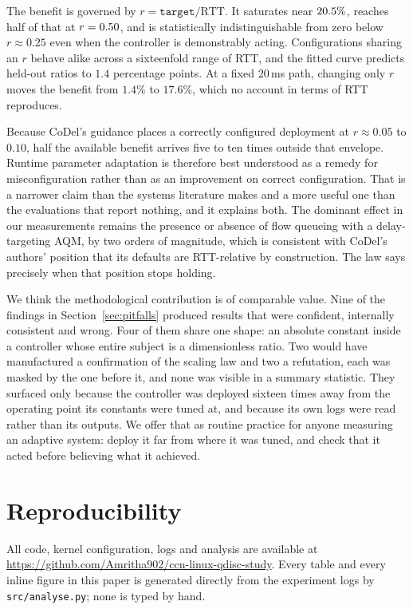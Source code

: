 \documentclass[conference]{IEEEtran}
\begin{document}
The benefit is governed by $r = \texttt{target}/\text{RTT}$. It saturates near
$20.5\%$, reaches half of that at $r = 0.50$, and is
statistically indistinguishable from zero below $r \approx 0.25$ even when the
controller is demonstrably acting. Configurations sharing an $r$ behave alike
across a sixteenfold range of RTT, and the fitted curve predicts held-out
ratios to $1.4$ percentage points. At a fixed $20$\,ms path, changing only $r$
moves the benefit from $1.4\%$ to $17.6\%$, which no account in terms of RTT
reproduces.

Because CoDel's guidance places a correctly configured deployment at
$r \approx 0.05$ to $0.10$, half the available benefit arrives five to ten times
outside that envelope. Runtime parameter adaptation is therefore best understood
as a remedy for misconfiguration rather than as an improvement on correct
configuration. That is a narrower claim than the systems literature makes and a
more useful one than the evaluations that report nothing, and it explains both.
The dominant effect in our measurements remains the presence or absence of flow
queueing with a delay-targeting AQM, by two orders of magnitude, which is
consistent with CoDel's authors' position that its defaults are RTT-relative by
construction. The law says precisely when that position stops holding.

We think the methodological contribution is of comparable value. Nine of the
findings in Section~\ref{sec:pitfalls} produced results that were confident,
internally consistent and wrong. Four of them share one shape: an absolute
constant inside a controller whose entire subject is a dimensionless ratio.
Two would have manufactured a confirmation of the scaling law and two a
refutation, each was masked by the one before it, and none was visible in a
summary statistic. They surfaced only because the controller was deployed
sixteen times away from the operating point its constants were tuned at, and
because its own logs were read rather than its outputs. We offer that as
routine practice for anyone measuring an adaptive system: deploy it far from
where it was tuned, and check that it acted before believing what it achieved.

\section*{Reproducibility}

All code, kernel configuration, logs and analysis are available at
\url{https://github.com/Amritha902/ccn-linux-qdisc-study}. Every table and
every inline figure in this paper is generated directly from the experiment
logs by \texttt{src/analyse.py}; none is typed by hand.
\end{document}
